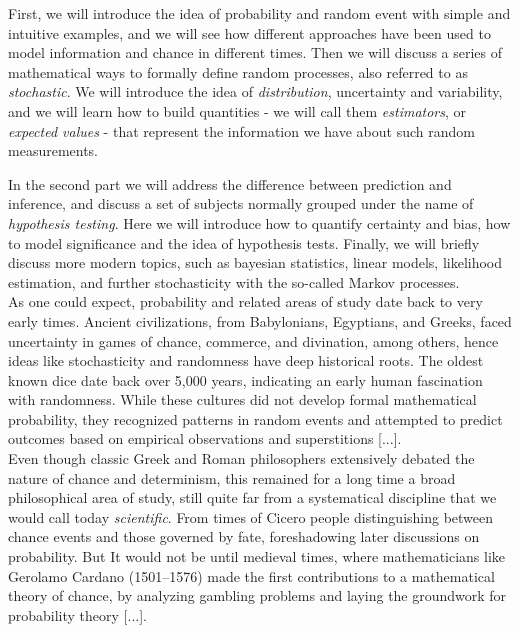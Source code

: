 \documentclass{book}
\begin{document}
First, we will introduce the idea of probability and random event with simple and intuitive examples, and we will see how different approaches have been used to model information and chance in different times. Then we will discuss a series of mathematical ways to formally define random processes, also referred to as \textit{stochastic}. We will introduce the idea of \textit{distribution}, uncertainty and variability, and we will learn how to build quantities - we will call them \textit{estimators}, or \textit{expected values} - that represent the information we have about such random measurements. 

In the second part we will address the difference between prediction and inference, and discuss a set of subjects normally grouped under the name of \textit{hypothesis testing}. Here we will introduce how to quantify certainty and bias, how to model significance and the idea of hypothesis tests. Finally, we will briefly discuss more modern topics, such as bayesian statistics, linear models, likelihood estimation, and further stochasticity with the so-called Markov processes.\\

As one could expect, probability and related areas of study date back to very early times. Ancient civilizations, from Babylonians, Egyptians, and Greeks, faced uncertainty in games of chance, commerce, and divination, among others, hence ideas like stochasticity and randomness have deep historical roots. The oldest known dice date back over 5,000 years, indicating an early human fascination with randomness. While these cultures did not develop formal mathematical probability, they recognized patterns in random events and attempted to predict outcomes based on empirical observations and superstitions [...].\\
\indent Even though classic Greek and Roman philosophers extensively debated the nature of chance and determinism, this remained for a long time a broad philosophical area of study, still quite far from a systematical discipline that we would call today \textit{scientific}. From times of Cicero people distinguishing between chance events and those governed by fate, foreshadowing later discussions on probability. But It would not be until medieval times, where mathematicians like Gerolamo Cardano (1501–1576) made the first contributions to a mathematical theory of chance, by analyzing gambling problems and laying the groundwork for probability theory  [...].\\
\end{document}
